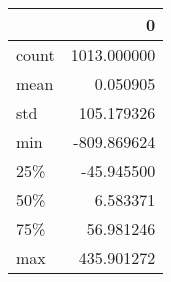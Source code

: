 \begin{tabular}{lr}
\toprule
{} &            0 \\
\midrule
count &  1013.000000 \\
mean  &     0.050905 \\
std   &   105.179326 \\
min   &  -809.869624 \\
25\%   &   -45.945500 \\
50\%   &     6.583371 \\
75\%   &    56.981246 \\
max   &   435.901272 \\
\bottomrule
\end{tabular}
